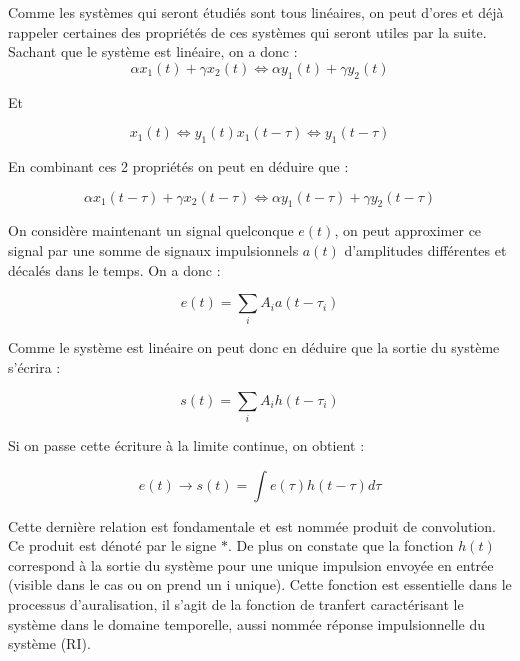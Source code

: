 Comme les systèmes qui seront étudiés sont tous linéaires, on peut d'ores et déjà rappeler certaines des propriétés de ces systèmes qui seront utiles par la suite.  
Sachant que le système est linéaire, on a donc :
\begin{equation}
    \alpha x_1(t) + \gamma x_2(t) \Leftrightarrow \alpha y_1(t) + \gamma y_2(t)       
\end{equation}

Et

\begin{equation}     
    x_1(t)  \Leftrightarrow y_1(t)                 
    x_1(t -\tau) \Leftrightarrow y_1(t -\tau)                
\end{equation}

En combinant ces 2 propriétés on peut en déduire que :

\begin{equation}       
    \alpha x_1(t - \tau) + \gamma x_2(t - \tau) \Leftrightarrow \alpha y_1(t - \tau) + \gamma y_2(t - \tau)       
\end{equation}

On considère maintenant un signal quelconque $e(t)$, on peut approximer ce signal par une somme de signaux impulsionnels $a(t)$ d'amplitudes différentes et décalés dans le temps.
On a donc :

\begin{equation}        
    e(t) = \sum_{i} A_i a(t - \tau_i)
\end{equation}

Comme le système est linéaire on peut donc en déduire que la sortie du système s'écrira :

\begin{equation}        
    s(t) = \sum_{i} A_i h(t - \tau_i)
\end{equation}

Si on passe cette écriture à la limite continue, on obtient :

\begin{equation}        
    e(t) \to s(t) = \int e(\tau)h(t -\tau)d\tau
\end{equation}

Cette dernière relation est fondamentale et est nommée produit de convolution. Ce produit est dénoté par le signe $\ast$.
De plus on constate que la fonction $h(t)$ correspond à la sortie du système pour une unique impulsion envoyée en entrée (visible dans le cas ou on prend un i unique).
Cette fonction est essentielle dans le processus d'auralisation, il s'agit de la fonction de tranfert caractérisant le système dans le domaine temporelle, aussi nommée réponse impulsionnelle du système (RI).


